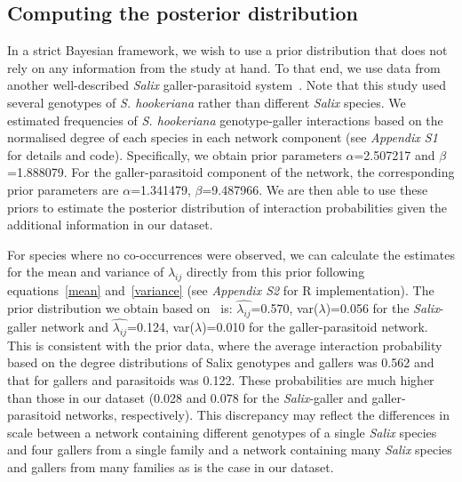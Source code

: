 \documentclass[12pt]{article}
\begin{document}

  \subsection*{Computing the posterior distribution}

      In a strict Bayesian framework, we wish to use a prior distribution that does not rely on any information from the study at hand. To that end, we use data from another well-described \emph{Salix} galler-parasitoid system~\citep{Barbour2016,Barbour2016Dryad}. Note that this study used several genotypes of \emph{S. hookeriana} rather than different \emph{Salix} species. We estimated frequencies of  \emph{S. hookeriana} genotype-galler interactions based on the normalised degree of each species in each network component (see \emph{Appendix S1} for details and code). Specifically, we obtain prior parameters $\alpha$=2.507217 and $\beta$=1.888079. For the galler-parasitoid component of the network, the corresponding prior parameters are $\alpha$=1.341479, $\beta$=9.487966. We are then able to use these priors to estimate the posterior distribution of interaction probabilities given the additional information in our dataset.
  
      For species where no co-occurrences were observed, we can 
      calculate the estimates for the mean and variance of 
      $\lambda_{ij}$ directly from this prior following 
      equations~\ref{mean} and~\ref{variance} 
      (see \emph{Appendix S2} for R implementation). The prior 
      distribution we obtain based on~\citet{Barbour2016,Barbour2016Dryad} is:
      $\hat{\lambda_{ij}}$=0.570, var($\lambda$)=0.056 for the \emph{Salix}-galler network and $\hat{\lambda_{ij}}$=0.124, var($\lambda$)=0.010 for the galler-parasitoid network. This is consistent with the prior data, where the average 
      interaction probability based on the degree distributions of Salix genotypes and gallers was 0.562 and that for gallers and parasitoids was 0.122. These probabilities are much higher than those in our dataset (0.028 and 0.078 for the \emph{Salix}-galler and galler-parasitoid networks, respectively). This discrepancy may reflect the differences in scale between a network containing different genotypes of a single \emph{Salix} species and four gallers from a single family and a network containing many \emph{Salix} species and gallers from many families as is the case in our dataset.
\end{document}
